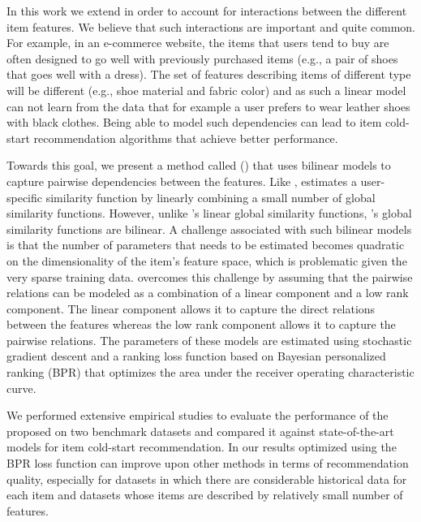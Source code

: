 \iffalse 
Besides the non-collaborative models, another important group of techniques used in cold-start recommender systems are collaborative methods~\cite{r1,r2,r3,r9}, which are based on latent factors. These models leverage the knowledge
available from all the users and their past preferences. However, these latent
factor methods don't perform well when sparsity of dataset grows, i.e., items have limited number of preferences on average~\cite{r29}.
\fi

In this work we extend \CFLIN in order to account for interactions between the
different item features. We believe that such interactions are
important and quite common. For example, in an e-commerce website, the items
that users tend to buy are often designed to go well with previously purchased
items (e.g., a pair of shoes that goes well with a dress). The set of features
describing items of different type will be different (e.g., shoe material and
fabric color) and as such a linear model can not learn from the data that for
example a user prefers to wear leather shoes with black clothes. Being able to model such
dependencies can lead to item cold-start recommendation algorithms that achieve
better performance.

Towards this goal, we present a method called \CFEXPB (\CF) that uses bilinear
models to capture pairwise dependencies between the features. Like \CFLIN, \CF
estimates a user-specific similarity function by linearly combining a small
number of global similarity functions. However, unlike \CFLIN's linear global
similarity functions, \CF's global similarity functions are bilinear.
A challenge associated with such bilinear models is that the number of
parameters that needs to be estimated becomes quadratic on the dimensionality of
the item's feature space, which is problematic given the very sparse training
data. \CF overcomes this challenge by assuming that the pairwise relations can
be modeled as a combination of a linear component and a low rank component. The
linear component allows it to capture the direct relations between the features
whereas the low rank component allows it to capture the pairwise
relations. 
The parameters of these models are
estimated using stochastic gradient descent and a ranking loss function based on
Bayesian personalized ranking (BPR) that optimizes the area under the receiver
operating characteristic curve.

We performed extensive empirical studies to evaluate the performance of the proposed
\CF on two benchmark datasets and compared it against state-of-the-art models for
item cold-start recommendation. In our results \CF optimized using the BPR loss function can
improve upon other methods in terms of recommendation quality, especially for
datasets in which there are considerable historical data for each item and
datasets whose items are described by relatively small number of features.

